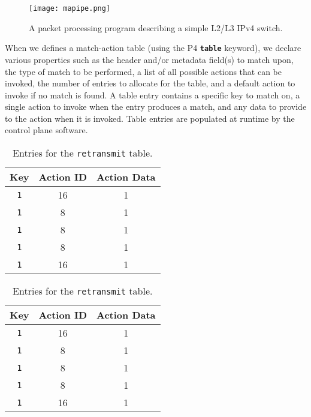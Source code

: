 \begin{figure}[!ht]
	\centering
	\texttt{[image: mapipe.png]}
	\caption{A packet processing program describing a simple L2/L3 IPv4 switch.}
	\label{mapipe}
\end{figure}

When we defines a match-action table (using the P4 \textbf{\texttt{table}} keyword), we declare various properties such as the header and/or metadata field(s) to match upon, the type of match to be performed, a list of all possible actions that can be invoked, the number of entries to allocate for the table, and a default action to invoke if no match is found. A table entry contains a specific key to match on, a single action to invoke when the entry produces a match, and any data to provide to the action when it is invoked. Table entries are populated at runtime by the control plane software.

\begin{table}[!h]
	\begin{minipage}{0.48\textwidth}
		\centering
		\caption{Entries for the \texttt{forward} table.}
		\label{forward}
		\begin{tabular}{ | c | c | c |}
			\hline
			\textbf{Key} & \textbf{Action ID} & \textbf{Action Data} \\ \hline
			\texttt{1}  & 16 & 1 \\ \hline
			\texttt{1} & 8 & 1 \\ \hline
			\texttt{1} & 8 & 1 \\ \hline
			\texttt{1} & 8 & 1 \\ \hline
			\texttt{1} & 16 & 1 \\ \hline
		\end{tabular}
	\end{minipage}
	\hfill
	\begin{minipage}{0.48\textwidth}
		\centering
		\caption{Entries for the \texttt{retransmit} table.}
		\label{retransmit}
		\begin{tabular}{ | c | c | c |}
			\hline
			\textbf{Key} & \textbf{Action ID} & \textbf{Action Data} \\ \hline
			\texttt{1}  & 16 & 1 \\ \hline
			\texttt{1} & 8 & 1 \\ \hline
			\texttt{1} & 8 & 1 \\ \hline
			\texttt{1} & 8 & 1 \\ \hline
			\texttt{1} & 16 & 1 \\ \hline
		\end{tabular}
	\end{minipage}
\end{table}

